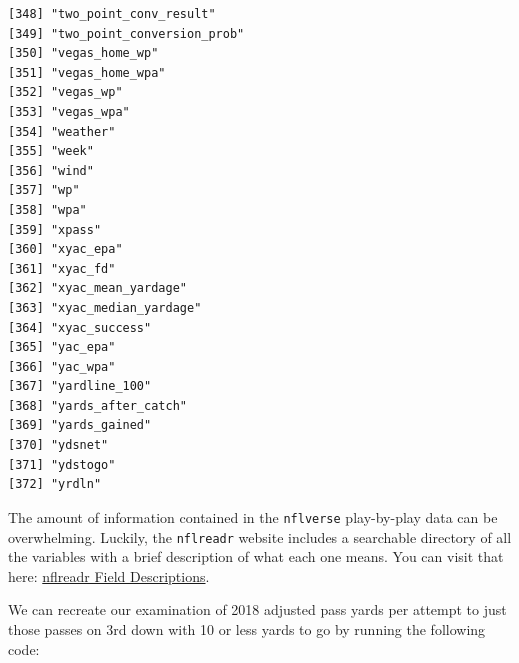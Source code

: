 \documentclass[
  letterpaper,
]{krantz}
\begin{document}
\begin{verbatim}
[348] "two_point_conv_result"               
[349] "two_point_conversion_prob"           
[350] "vegas_home_wp"                       
[351] "vegas_home_wpa"                      
[352] "vegas_wp"                            
[353] "vegas_wpa"                           
[354] "weather"                             
[355] "week"                                
[356] "wind"                                
[357] "wp"                                  
[358] "wpa"                                 
[359] "xpass"                               
[360] "xyac_epa"                            
[361] "xyac_fd"                             
[362] "xyac_mean_yardage"                   
[363] "xyac_median_yardage"                 
[364] "xyac_success"                        
[365] "yac_epa"                             
[366] "yac_wpa"                             
[367] "yardline_100"                        
[368] "yards_after_catch"                   
[369] "yards_gained"                        
[370] "ydsnet"                              
[371] "ydstogo"                             
[372] "yrdln"                               
\end{verbatim}

The amount of information contained in the \texttt{nflverse}
play-by-play data can be overwhelming. Luckily, the \texttt{nflreadr}
website includes a searchable directory of all the variables with a
brief description of what each one means. You can visit that here:
\href{https://nflreadr.nflverse.com/articles/dictionary_pbp.html}{nflreadr
Field Descriptions}.

We can recreate our examination of 2018 adjusted pass yards per attempt
to just those passes on 3rd down with 10 or less yards to go by running
the following code:
\end{document}
